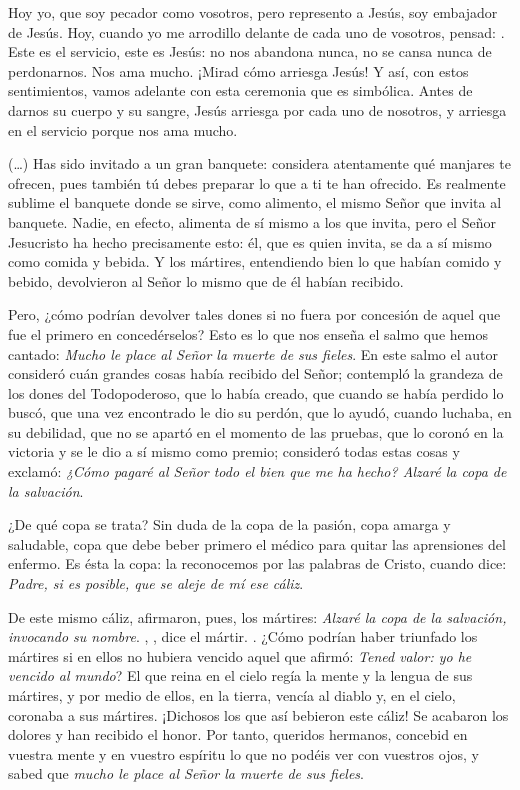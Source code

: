 \begin{body}
Hoy yo, que soy pecador como vosotros, pero represento a Jesús, soy embajador de Jesús. Hoy, cuando yo me arrodillo delante de cada uno de vosotros, pensad: . Este es el servicio, este es Jesús: no nos abandona nunca, no se cansa nunca de perdonarnos. Nos ama mucho. ¡Mirad cómo arriesga Jesús! Y así, con estos sentimientos, vamos adelante con esta ceremonia que es simbólica. Antes de darnos su cuerpo y su sangre, Jesús arriesga por cada uno de nosotros, y arriesga en el servicio porque nos ama mucho. 
\end{body}


\begin{patercite}
(\ldots) Has sido invitado a un gran banquete: considera atentamente qué manjares te ofrecen, pues también tú	debes preparar lo que a ti te han ofrecido. Es realmente sublime el	banquete donde se sirve, como alimento, el mismo Señor que invita al	banquete. Nadie, en efecto, alimenta de sí mismo a los que invita, pero el Señor Jesucristo ha hecho precisamente esto: él, que es quien invita, se da a sí mismo como comida y bebida. Y los mártires, entendiendo bien lo que habían comido y bebido, devolvieron al Señor lo mismo que de él	habían recibido. 
	
Pero, ¿cómo podrían devolver tales dones si no fuera por concesión de aquel que fue el primero en concedérselos? Esto es lo que nos enseña el	salmo que hemos cantado: \textit{Mucho le place al Señor la muerte de sus fieles}. En este salmo el autor consideró cuán grandes cosas había recibido del Señor; contempló la grandeza de los dones del Todopoderoso, que lo había creado, que cuando se había perdido lo buscó, que una vez encontrado le dio su perdón, que lo ayudó, cuando luchaba, en su debilidad, que no se	apartó en el momento de las pruebas, que lo coronó en la victoria y se le dio a sí mismo como premio; consideró todas estas cosas y exclamó: \textit{¿Cómo pagaré al Señor todo el bien que me ha hecho? Alzaré la copa de la salvación}.
	
¿De qué copa se trata? Sin duda de la copa de la pasión, copa amarga y	saludable, copa que debe beber primero el médico para quitar las aprensiones del enfermo. Es ésta la copa: la reconocemos por las	palabras de Cristo, cuando dice: \textit{Padre, si es posible, que se aleje de mí ese cáliz}.
	
De este mismo cáliz, afirmaron, pues, los mártires: \textit{Alzaré la copa de la salvación, invocando su nombre}. , , dice el mártir.  . ¿Cómo podrían haber triunfado los mártires si en ellos no hubiera vencido aquel que afirmó: \textit{Tened valor: yo he vencido al mundo}? El que reina en el cielo regía la mente y la lengua de sus mártires, y	por medio de ellos, en la tierra, vencía al diablo y, en el cielo, coronaba a sus mártires. ¡Dichosos los que así bebieron este cáliz! Se	acabaron los dolores y han recibido el honor. Por tanto, queridos hermanos, concebid en vuestra mente y en vuestro	espíritu lo que no podéis ver con vuestros ojos, y sabed que \textit{mucho le place al Señor la muerte de sus fieles}.
	

\end{patercite}
